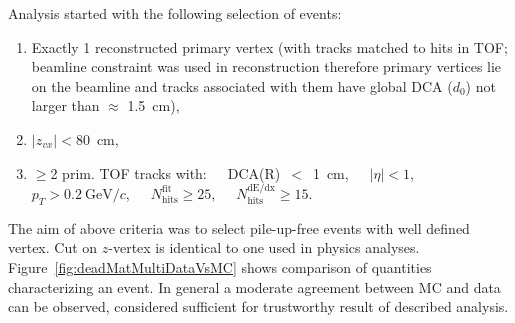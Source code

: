 Analysis started with the following selection of events:\vspace{-5pt}
\begin{enumerate}
 \item Exactly 1 reconstructed primary vertex (with tracks matched to hits in TOF; beamline constraint was used in reconstruction therefore primary vertices lie on the beamline and tracks associated with them have global DCA ($d_{0}$) not larger than $\approx$ 1.5~cm),\vspace{-5pt}
 \item $|z_{vx}|<80$~cm\vspace{-5pt},
 \item $\geq$2 prim. TOF tracks with:~~~DCA(R)~$<$~1~cm,~~~$|\eta|<1$,~~~$p_{T}>0.2~\text{GeV}/c$,~~~$N_{\textrm{hits}}^{\textrm{fit}}\geq25$,~~~$N_{\textrm{hits}}^{\textrm{dE/dx}}\geq15$.%
\end{enumerate}%
The aim of above criteria was to select pile-up-free events with well defined vertex. Cut on $z$-vertex is identical to one used in physics analyses. Figure~\ref{fig:deadMatMultiDataVsMC} shows comparison of quantities characterizing an event. In general a moderate agreement between MC and data can be observed, considered sufficient for trustworthy result of described analysis.
